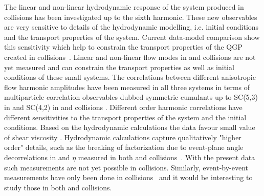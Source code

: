 \documentclass[../report.tex]{subfiles}
\begin{document}
The linear and non-linear hydrodynamic response of the system produced in \PbPb collisions has been investigated up to the sixth harmonic. These new observables are very sensitive to details of the hydrodynamic modelling, i.e. initial conditions and the transport properties of the system. Current data-model comparison show this sensitivity which help to constrain the transport properties of the QGP created in \PbPb collisions~\cite{Acharya:2017zfg}. Linear and non-linear flow modes in \pp and \pPb collisions are not yet measured and can constrain the transport properties as well as initial conditions of these small systems. The correlations between different anisotropic flow harmonic amplitudes have been measured in all three systems in terms of multiparticle correlation observables dubbed symmetric cumulants up to SC(5,3) in \PbPb and SC(4,2) in \pPb and \pp collisions \cite{Aad:2014fla,Aad:2015lwa,ALICE:2016kpq,Sirunyan:2017uyl,Acharya:2017gsw,Aaboud:2018syf}. Different order harmonic correlations have different sensitivities to the transport properties of the system and the initial conditions. Based on the hydrodynamic calculations the data favour small value of shear viscosity \cite{Zhu:2016puf}.
Hydrodynamic calculations capture qualitatively "higher order" details, such as the breaking of factorization due to event-plane angle decorrelations in \pT and $\eta$ measured in both \PbPb and \pPb collisions~\cite{Khachatryan:2015oea,Sirunyan:2017gyb,Acharya:2017ino}. With the present data such measurements are not yet possible in \pp collisions. Similarly, event-by-event \vn measurements have only been done in \PbPb collisions~\cite{Aad:2013xma,Sirunyan:2017fts,Acharya:2018lmh} and it would be interesting to study those in both \pPb and \pp collisions. 
\end{document}
